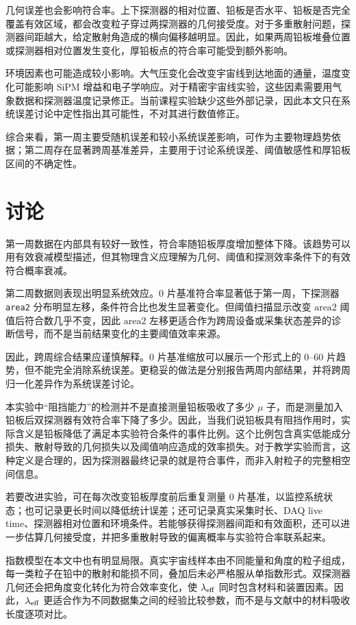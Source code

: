 \documentclass[aps,prl,twocolumn,superscriptaddress,nofootinbib]{revtex4-2}
\begin{document}
几何误差也会影响符合率。上下探测器的相对位置、铅板是否水平、铅板是否完全覆盖有效区域，都会改变粒子穿过两探测器的几何接受度。对于多重散射问题，探测器间距越大，给定散射角造成的横向偏移越明显。因此，如果两周铅板堆叠位置或探测器相对位置发生变化，厚铅板点的符合率可能受到额外影响。

环境因素也可能造成较小影响。大气压变化会改变宇宙线到达地面的通量，温度变化可能影响 SiPM 增益和电子学响应。对于精密宇宙线实验，这些因素需要用气象数据和探测器温度记录修正。当前课程实验缺少这些外部记录，因此本文只在系统误差讨论中定性指出其可能性，不对其进行数值修正。

综合来看，第一周主要受随机误差和较小系统误差影响，可作为主要物理趋势依据；第二周存在显著跨周基准差异，主要用于讨论系统误差、阈值敏感性和厚铅板区间的不确定性。


\section{讨论}

第一周数据在内部具有较好一致性，符合率随铅板厚度增加整体下降。该趋势可以用有效衰减模型描述，但其物理含义应理解为几何、阈值和探测效率条件下的有效符合概率衰减。

第二周数据则表现出明显系统效应。0 片基准符合率显著低于第一周，下探测器 \texttt{area2} 分布明显左移，条件符合比也发生显著变化。但阈值扫描显示改变 \(\mathrm{area2}\) 阈值后符合数几乎不变，因此 \(\mathrm{area2}\) 左移更适合作为跨周设备或采集状态差异的诊断信号，而不是当前结果变化的主要阈值效率来源。

因此，跨周综合结果应谨慎解释。0 片基准缩放可以展示一个形式上的 0--60 片趋势，但不能完全消除系统误差。更稳妥的做法是分别报告两周内部结果，并将跨周归一化差异作为系统误差讨论。

本实验中“阻挡能力”的检测并不是直接测量铅板吸收了多少 $\mu$ 子，而是测量加入铅板后双探测器有效符合率下降了多少。因此，当我们说铅板具有阻挡作用时，实际含义是铅板降低了满足本实验符合条件的事件比例。这个比例包含真实低能成分损失、散射导致的几何损失以及阈值响应造成的效率损失。对于教学实验而言，这种定义是合理的，因为探测器最终记录的就是符合事件，而非入射粒子的完整相空间信息。

若要改进实验，可在每次改变铅板厚度前后重复测量 0 片基准，以监控系统状态；也可记录更长时间以降低统计误差；还可记录真实采集时长、DAQ live time、探测器相对位置和环境条件。若能够获得探测器间距和有效面积，还可以进一步估算几何接受度，并把多重散射导致的偏离概率与实验符合率联系起来。

指数模型在本文中也有明显局限。真实宇宙线样本由不同能量和角度的粒子组成，每一类粒子在铅中的散射和能损不同，叠加后未必严格服从单指数形式。双探测器几何还会把角度变化转化为符合效率变化，使 $\lambda_{\rm eff}$ 同时包含材料和装置因素。因此，$\lambda_{\rm eff}$ 更适合作为不同数据集之间的经验比较参数，而不是与文献中的材料吸收长度逐项对比。
\end{document}
